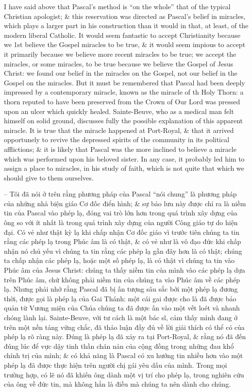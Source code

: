 \documentclass{article}
\begin{document}
\begin{enumerate}
\begin{itemize}
		I have said above that {\sc Pascal}'s method is ``on the whole'' that of the typical Christian apologist; \& this reservation was directed as {\sc Pascal}'s belief in miracles, which plays a larger part in his construction than it would in that, at least, of the modern liberal Catholic. It would seem fantastic to accept Christianity because we 1st believe the Gospel miracles to be true, \& it would seem impious to accept it primarily because we believe more recent miracles to be true; we accept the miracles, or some miracles, to be true because we believe the Gospel of {\sc Jesus Christ}: we found our belief in the miracles on the Gospel, not our belief in the Gospel on the miracles. But it must be remembered that {\sc Pascal} had been deeply impressed by a contemporary miracle, known as the miracle of th Holy Thorn: a thorn reputed to have been preserved from the Crown of Our Lord was pressed upon an ulcer which quickly healed. {\sc Sainte-Beuve}, who as a medical man felt himself on solid ground, discusses fully the possible explanation of this apparent miracle. It is true that the miracle happened at Port-Royal, \& that it arrived opportunely to revive the depressed spirits of the community in its political afflictions; \& it is likely that {\sc Pascal} was the more inclined to believe a miracle which was performed upon his beloved sister. In any case, it probably led him to assign a place to miracles, in his study of faith, which is not quite that which we should give to them ourselves.
		
		-- Tôi đã nói ở trên rằng phương pháp của {\sc Pascal} ``nói chung'' là phương pháp của những nhà biện giáo Cơ đốc điển hình; \& sự bảo lưu này được chỉ ra là niềm tin của {\sc Pascal} vào phép lạ, đóng vai trò lớn hơn trong quá trình xây dựng của ông so với ít nhất là trong quá trình xây dựng của người Công giáo tự do hiện đại. Có vẻ như thật kỳ lạ khi chấp nhận Cơ đốc giáo vì trước tiên chúng ta tin rằng các phép lạ trong Phúc âm là có thật, \& có vẻ như là vô đạo đức khi chấp nhận nó chủ yếu vì chúng ta tin rằng các phép lạ gần đây hơn là có thật; chúng ta chấp nhận các phép lạ, hoặc một số phép lạ, là có thật vì chúng ta tin vào Phúc âm của {\sc Jesus Christ}: chúng ta thấy niềm tin của mình vào các phép lạ dựa trên Phúc âm, chứ không phải niềm tin của chúng ta vào Phúc âm về các phép lạ. Nhưng phải nhớ rằng {\sc Pascal} đã bị ấn tượng sâu sắc bởi một phép lạ đương thời, được gọi là phép lạ của Gai Thánh: một cái gai được cho là đã được bảo quản từ Vương miện của Chúa chúng ta đã được ấn vào một vết loét và nhanh chóng lành lại. {\sc Sainte-Beuve}, với tư cách là một bác sĩ, cảm thấy mình đang ở trên một nền tảng vững chắc, đã thảo luận đầy đủ về lời giải thích có thể có của phép lạ rõ ràng này. Đúng là phép lạ đã xảy ra tại Port-Royal, \& rằng nó đã đến đúng lúc để vực dậy tinh thần chán nản của cộng đồng trong những đau khổ chính trị của mình; \& có khả năng là {\sc Pascal} có xu hướng tin nhiều hơn vào một phép lạ đã được thực hiện trên người chị gái yêu dấu của mình. Trong mọi trường hợp, có lẽ nó đã khiến ông dành một vị trí cho phép lạ, trong nghiên cứu của ông về đức tin, mà không hẳn là điều mà chúng ta nên dành cho chúng.
		

\end{itemize}
\end{enumerate}
\end{document}
